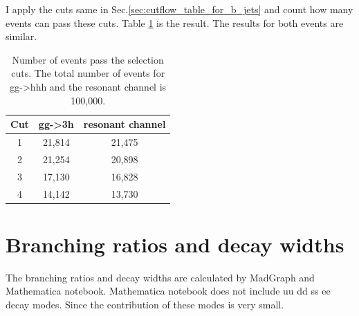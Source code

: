 \documentclass[12pt]{article}
\begin{document}
	I apply the cuts same in Sec.\ref{sec:cutflow_table_for_b_jets} and count how many events can pass these cuts. Table \ref{tab:cutflow_table_signal_and_resonant_bjet} is the result. The results for both events are similar.
	\begin{table}[htpb]
		\centering
		\caption{Number of events pass the selection cuts. The total number of events for gg->hhh and the resonant channel is 100,000.}
		\label{tab:cutflow_table_signal_and_resonant_bjet}
		\begin{tabular}{ccc}
			Cut &  gg->3h & resonant channel \\
			\hline
			1 & 21,814 & 21,475\\
			2 & 21,254 & 20,898\\
			3 & 17,130 & 16,828\\
			4 & 14,142 & 13,730
		\end{tabular}	
	\end{table}

\section{Branching ratios and decay widths}%
\label{sec:branching_ratios_and_decay_widths}
	The branching ratios and decay widths are calculated by MadGraph and Mathematica notebook. Mathematica notebook does not include uu dd ss ee decay modes. Since the contribution of these modes is very small. 
\end{document}
